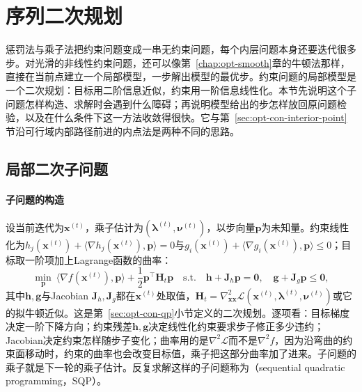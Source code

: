 \section{序列二次规划}
\label{sec:opt-con-sqp}

惩罚法与乘子法把约束问题变成一串无约束问题，每个内层问题本身还要迭代很多步。对光滑的非线性约束问题，还可以像第~\ref{chap:opt-smooth}章的牛顿法那样，直接在当前点建立一个局部模型，一步解出模型的最优步。约束问题的局部模型是一个二次规划：目标用二阶信息近似，约束用一阶信息线性化。本节先说明这个子问题怎样构造、求解时会遇到什么障碍；再说明模型给出的步怎样放回原问题检验，以及在什么条件下这一方法收敛得很快。它与第~\ref{sec:opt-con-interior-point}节沿可行域内部路径前进的内点法是两种不同的思路。

\subsection{局部二次子问题}
\label{sec:opt-con-sqp-subproblem}

\paragraph{子问题的构造}
设当前迭代为$\bm x^{(t)}$，乘子估计为$(\bm\lambda^{(t)},\bm\nu^{(t)})$，以步向量$\bm p$为未知量。约束线性化为$h_j(\bm x^{(t)})+\langle\nabla h_j(\bm x^{(t)}),\bm p\rangle=0$与$g_i(\bm x^{(t)})+\langle\nabla g_i(\bm x^{(t)}),\bm p\rangle\leq0$；目标取一阶项加上Lagrange函数的曲率：
\begin{equation}
\label{eq:opt-con-sqp-subproblem}
  \min_{\bm p}\ \langle\nabla f(\bm x^{(t)}),\bm p\rangle+\frac12\bm p^\top\bm H_t\bm p
  \quad\text{s.t.}\quad
  \bm h+\bm J_h\bm p=\bm0,\quad\bm g+\bm J_g\bm p\leq\bm0,
\end{equation}
其中$\bm h,\bm g$与Jacobian $\bm J_h,\bm J_g$都在$\bm x^{(t)}$处取值，$\bm H_t=\nabla^2_{\bm x\bm x}\mathcal L(\bm x^{(t)},\bm\lambda^{(t)},\bm\nu^{(t)})$或它的拟牛顿近似。这是第~\ref{sec:opt-con-qp}小节定义的二次规划。逐项看：目标梯度决定一阶下降方向；约束残差$\bm h,\bm g$决定线性化约束要求步子修正多少违约；Jacobian决定约束怎样随步子变化；曲率用的是$\nabla^2\mathcal L$而不是$\nabla^2f$，因为沿弯曲的约束面移动时，约束的曲率也会改变目标值，乘子把这部分曲率加了进来。子问题的乘子就是下一轮的乘子估计。反复求解这样的子问题称为（sequential quadratic programming，SQP）。

